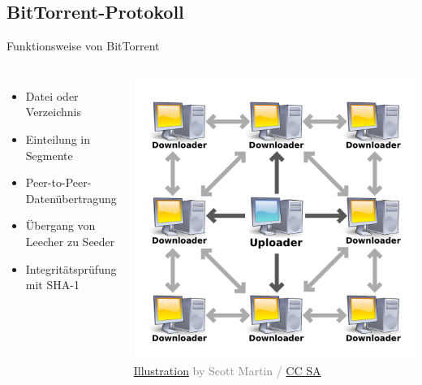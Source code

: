\documentclass[dvipsnames]{beamer} %
\providecommand{\attribution}[4]{\textcolor{gray}{\tiny \href{#1}{Illustration} by #2 / \href{#3}{#4}}}
\begin{document}
	\subsection{BitTorrent-Protokoll}
	\begin{frame}{Funktionsweise von BitTorrent}
		\begin{columns}
			\begin{itemize}
				\item Datei oder Verzeichnis
				\item Einteilung in Segmente
				\item Peer-to-Peer-Datenübertragung
				\item Übergang von Leecher zu Seeder
				\item Integritätsprüfung mit SHA-1
			\end{itemize}
			\centering
	    \includegraphics[width=\textwidth]{BitTorrent_network}\\
	    \attribution{https://commons.wikimedia.org/wiki/File:BitTorrent_network.svg}{Scott Martin}{https://creativecommons.org/licenses/by-sa/3.0/deed.en}{CC SA}
		\end{columns}
	\end{frame}
\end{document}
